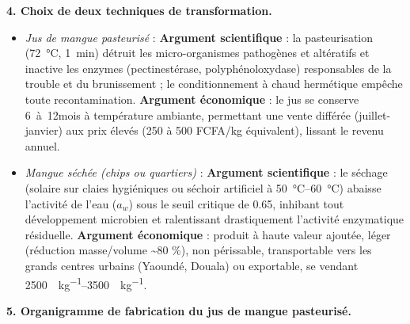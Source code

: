 \documentclass[11pt]{article}
\begin{document}
\begin{exoresolu}
\textbf{4. Choix de deux techniques de transformation.}
\begin{itemize}
\item \emph{Jus de mangue pasteurisé} : \textbf{Argument scientifique} : la pasteurisation (\SI{72}{\celsius}, \SI{1}{min}) détruit les micro-organismes pathogènes et altératifs et inactive les enzymes (pectinestérase, polyphénoloxydase) responsables de la trouble et du brunissement ; le conditionnement à chaud hermétique empêche toute recontamination. \textbf{Argument économique} : le jus se conserve \SI{6}{à 12}{mois} à température ambiante, permettant une vente différée (juillet-janvier) aux prix élevés (250 à 500 FCFA/kg équivalent), lissant le revenu annuel.
\item \emph{Mangue séchée (chips ou quartiers)} : \textbf{Argument scientifique} : le séchage (solaire sur claies hygiéniques ou séchoir artificiel à \SIrange{50}{60}{\celsius}) abaisse l'activité de l'eau ($a_w$) sous le seuil critique de \num{0,65}, inhibant tout développement microbien et ralentissant drastiquement l'activité enzymatique résiduelle. \textbf{Argument économique} : produit à haute valeur ajoutée, léger (réduction masse/volume \textasciitilde 80 \%), non périssable, transportable vers les grands centres urbains (Yaoundé, Douala) ou exportable, se vendant \SIrange{2500}{3500}{\FCFA\per\kilo\gram}.
\end{itemize}

\textbf{5. Organigramme de fabrication du jus de mangue pasteurisé.}


\end{exoresolu}
\end{document}
